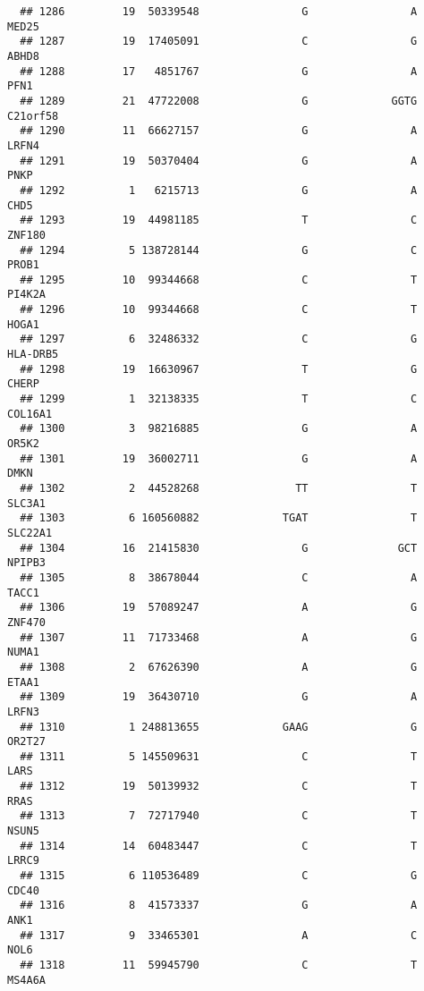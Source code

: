 \documentclass[12pt,twoside]{reedthesis}
\theoremstyle{definition}
\theoremstyle{definition}
\theoremstyle{remark}
\begin{document}
\begin{verbatim}
  ## 1286         19  50339548                G                A          MED25
  ## 1287         19  17405091                C                G          ABHD8
  ## 1288         17   4851767                G                A           PFN1
  ## 1289         21  47722008                G             GGTG       C21orf58
  ## 1290         11  66627157                G                A          LRFN4
  ## 1291         19  50370404                G                A           PNKP
  ## 1292          1   6215713                G                A           CHD5
  ## 1293         19  44981185                T                C         ZNF180
  ## 1294          5 138728144                G                C          PROB1
  ## 1295         10  99344668                C                T         PI4K2A
  ## 1296         10  99344668                C                T          HOGA1
  ## 1297          6  32486332                C                G       HLA-DRB5
  ## 1298         19  16630967                T                G          CHERP
  ## 1299          1  32138335                T                C        COL16A1
  ## 1300          3  98216885                G                A          OR5K2
  ## 1301         19  36002711                G                A           DMKN
  ## 1302          2  44528268               TT                T         SLC3A1
  ## 1303          6 160560882             TGAT                T        SLC22A1
  ## 1304         16  21415830                G              GCT         NPIPB3
  ## 1305          8  38678044                C                A          TACC1
  ## 1306         19  57089247                A                G         ZNF470
  ## 1307         11  71733468                A                G          NUMA1
  ## 1308          2  67626390                A                G          ETAA1
  ## 1309         19  36430710                G                A          LRFN3
  ## 1310          1 248813655             GAAG                G         OR2T27
  ## 1311          5 145509631                C                T           LARS
  ## 1312         19  50139932                C                T           RRAS
  ## 1313          7  72717940                C                T          NSUN5
  ## 1314         14  60483447                C                T          LRRC9
  ## 1315          6 110536489                C                G          CDC40
  ## 1316          8  41573337                G                A           ANK1
  ## 1317          9  33465301                A                C           NOL6
  ## 1318         11  59945790                C                T         MS4A6A

\end{verbatim}
\end{document}
